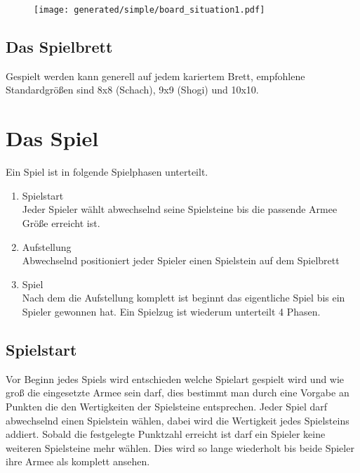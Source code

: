 \documentclass{article}
\begin{document}
	
	\begin{figure}[h]
	\texttt{[image: generated/simple/board\_situation1.pdf]}
	\end{figure}
	

	

\subsection{Das Spielbrett}
	Gespielt werden kann generell auf jedem kariertem Brett, empfohlene Standardgrößen sind
	8x8 (Schach), 9x9 (Shogi) und 10x10.
	

\section{Das Spiel}

	Ein Spiel ist in folgende Spielphasen unterteilt.

	\begin{enumerate}
	\item Spielstart \\
	 	  Jeder Spieler wählt abwechselnd seine Spielsteine bis die passende Armee Größe erreicht ist.
	\item Aufstellung \\
	  	  Abwechselnd positioniert jeder Spieler einen Spielstein auf dem Spielbrett
	\item Spiel \\
	  	  Nach dem die Aufstellung komplett ist beginnt das eigentliche Spiel bis ein Spieler gewonnen hat.
	  	  Ein Spielzug ist wiederum unterteilt 4 Phasen.
	\end{enumerate}


\subsection{Spielstart}
	Vor Beginn jedes Spiels wird entschieden welche Spielart gespielt wird und wie groß die eingesetzte Armee sein darf,
	dies bestimmt man durch eine Vorgabe an Punkten die den Wertigkeiten der Spielsteine entsprechen.
	Jeder Spiel darf abwechselnd einen Spielstein wählen, dabei wird die Wertigkeit jedes Spielsteins addiert.
	Sobald die festgelegte Punktzahl erreicht ist darf ein Spieler keine weiteren Spielsteine mehr wählen.
	Dies wird so lange wiederholt bis beide Spieler ihre Armee als komplett ansehen.
\end{document}
